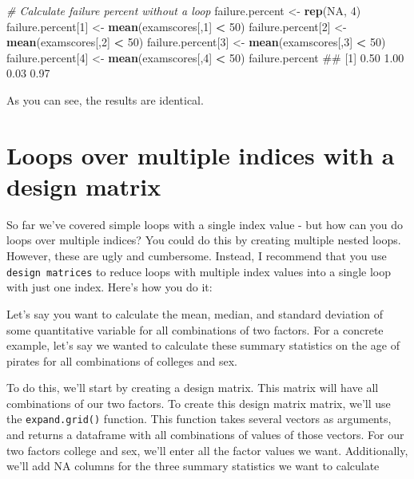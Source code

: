\documentclass[]{book}
\newenvironment{Shaded}{\begin{snugshade}}{\end{snugshade}}
\newcommand{\KeywordTok}[1]{\textcolor[rgb]{0.13,0.29,0.53}{\textbf{#1}}}
\newcommand{\DecValTok}[1]{\textcolor[rgb]{0.00,0.00,0.81}{#1}}
\newcommand{\StringTok}[1]{\textcolor[rgb]{0.31,0.60,0.02}{#1}}
\newcommand{\CommentTok}[1]{\textcolor[rgb]{0.56,0.35,0.01}{\textit{#1}}}
\newcommand{\OtherTok}[1]{\textcolor[rgb]{0.56,0.35,0.01}{#1}}
\newcommand{\OperatorTok}[1]{\textcolor[rgb]{0.81,0.36,0.00}{\textbf{#1}}}
\newcommand{\NormalTok}[1]{#1}
\theoremstyle{definition}
\theoremstyle{definition}
\theoremstyle{remark}
\begin{document}
\begin{Shaded}
\begin{Highlighting}[]
\CommentTok{# Calculate failure percent without a loop}
\NormalTok{failure.percent <-}\StringTok{ }\KeywordTok{rep}\NormalTok{(}\OtherTok{NA}\NormalTok{, }\DecValTok{4}\NormalTok{)}
\NormalTok{failure.percent[}\DecValTok{1}\NormalTok{] <-}\StringTok{ }\KeywordTok{mean}\NormalTok{(examscores[,}\DecValTok{1}\NormalTok{] }\OperatorTok{<}\StringTok{ }\DecValTok{50}\NormalTok{)}
\NormalTok{failure.percent[}\DecValTok{2}\NormalTok{] <-}\StringTok{ }\KeywordTok{mean}\NormalTok{(examscores[,}\DecValTok{2}\NormalTok{] }\OperatorTok{<}\StringTok{ }\DecValTok{50}\NormalTok{)}
\NormalTok{failure.percent[}\DecValTok{3}\NormalTok{] <-}\StringTok{ }\KeywordTok{mean}\NormalTok{(examscores[,}\DecValTok{3}\NormalTok{] }\OperatorTok{<}\StringTok{ }\DecValTok{50}\NormalTok{)}
\NormalTok{failure.percent[}\DecValTok{4}\NormalTok{] <-}\StringTok{ }\KeywordTok{mean}\NormalTok{(examscores[,}\DecValTok{4}\NormalTok{] }\OperatorTok{<}\StringTok{ }\DecValTok{50}\NormalTok{)}
\NormalTok{failure.percent}
\NormalTok{## [1] 0.50 1.00 0.03 0.97}
\end{Highlighting}
\end{Shaded}

As you can see, the results are identical.

\section{Loops over multiple indices with a design
matrix}\label{loops-over-multiple-indices-with-a-design-matrix}

So far we've covered simple loops with a single index value - but how
can you do loops over multiple indices? You could do this by creating
multiple nested loops. However, these are ugly and cumbersome. Instead,
I recommend that you use \texttt{design\ matrices} to reduce loops with
multiple index values into a single loop with just one index. Here's how
you do it:

Let's say you want to calculate the mean, median, and standard deviation
of some quantitative variable for all combinations of two factors. For a
concrete example, let's say we wanted to calculate these summary
statistics on the age of pirates for all combinations of colleges and
sex.

To do this, we'll start by creating a design matrix. This matrix will
have all combinations of our two factors. To create this design matrix
matrix, we'll use the \texttt{expand.grid()} function. This function
takes several vectors as arguments, and returns a dataframe with all
combinations of values of those vectors. For our two factors college and
sex, we'll enter all the factor values we want. Additionally, we'll add
NA columns for the three summary statistics we want to calculate
\end{document}
